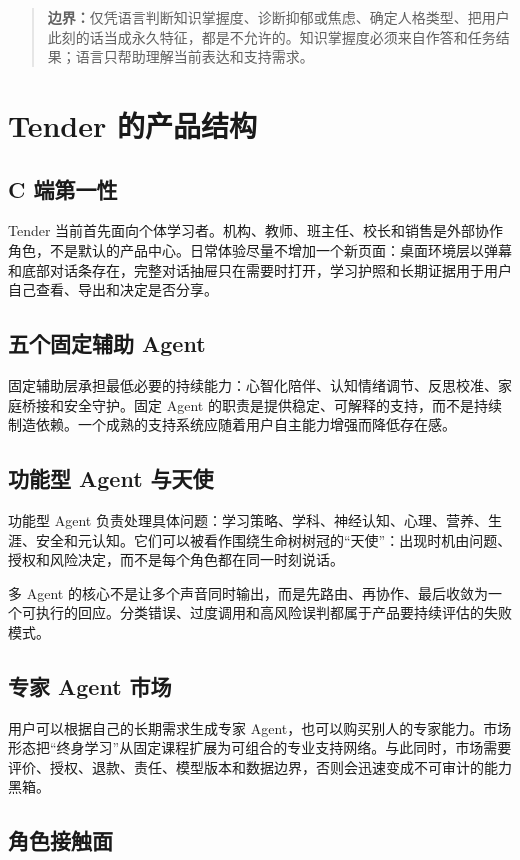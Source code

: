 \documentclass[UTF8,a4paper,11pt]{ctexart}
\newcommand{\boundary}[1]{\begin{quote}\noindent\textbf{\color{TenderPink}边界：}#1\end{quote}}
\begin{document}
\boundary{仅凭语言判断知识掌握度、诊断抑郁或焦虑、确定人格类型、把用户此刻的话当成永久特征，都是不允许的。知识掌握度必须来自作答和任务结果；语言只帮助理解当前表达和支持需求。}

\section{Tender 的产品结构}

\subsection{C 端第一性}

Tender 当前首先面向个体学习者。机构、教师、班主任、校长和销售是外部协作角色，不是默认的产品中心。日常体验尽量不增加一个新页面：桌面环境层以弹幕和底部对话条存在，完整对话抽屉只在需要时打开，学习护照和长期证据用于用户自己查看、导出和决定是否分享。

\subsection{五个固定辅助 Agent}

固定辅助层承担最低必要的持续能力：心智化陪伴、认知情绪调节、反思校准、家庭桥接和安全守护。固定 Agent 的职责是提供稳定、可解释的支持，而不是持续制造依赖。一个成熟的支持系统应随着用户自主能力增强而降低存在感。

\subsection{功能型 Agent 与天使}

功能型 Agent 负责处理具体问题：学习策略、学科、神经认知、心理、营养、生涯、安全和元认知。它们可以被看作围绕生命树树冠的“天使”：出现时机由问题、授权和风险决定，而不是每个角色都在同一时刻说话。

多 Agent 的核心不是让多个声音同时输出，而是先路由、再协作、最后收敛为一个可执行的回应。分类错误、过度调用和高风险误判都属于产品要持续评估的失败模式。

\subsection{专家 Agent 市场}

用户可以根据自己的长期需求生成专家 Agent，也可以购买别人的专家能力。市场形态把“终身学习”从固定课程扩展为可组合的专业支持网络。与此同时，市场需要评价、授权、退款、责任、模型版本和数据边界，否则会迅速变成不可审计的能力黑箱。

\subsection{角色接触面}
\end{document}
